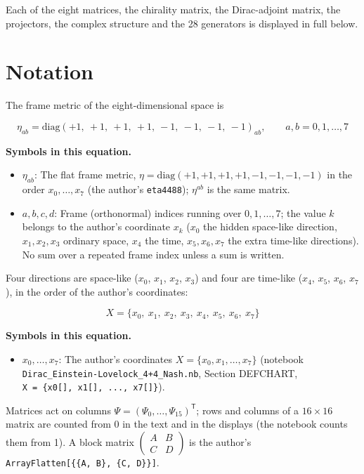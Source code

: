\documentclass[
  10pt,
]{article}
\providecommand{\tightlist}{%
  \setlength{\itemsep}{0pt}\setlength{\parskip}{0pt}}
\begin{document}
Each of the eight matrices, the chirality matrix, the Dirac-adjoint
matrix, the projectors, the complex structure and the 28 generators is
displayed in full below.

\hypertarget{notation}{%
\section{Notation}\label{notation}}

The frame metric of the eight-dimensional space is

\[
\eta_{ab} = \mathrm{diag}(+1,\ +1,\ +1,\ +1,\ -1,\ -1,\ -1,\ -1)_{ab},\qquad a, b = 0, 1, \dots, 7
\]

\textbf{Symbols in this equation.}

\begin{itemize}
\tightlist
\item
  \(\eta_{ab}\): The flat frame metric,
  \(\eta = \mathrm{diag}(+1, +1, +1, +1, -1, -1, -1, -1)\) in the order
  \(x_0, \dots, x_7\) (the author's \texttt{eta4488}); \(\eta^{ab}\) is
  the same matrix.
\item
  \(a, b, c, d\): Frame (orthonormal) indices running over
  \(0, 1, \dots, 7\); the value \(k\) belongs to the author's coordinate
  \(x_k\) (\(x_0\) the hidden space-like direction, \(x_1, x_2, x_3\)
  ordinary space, \(x_4\) the time, \(x_5, x_6, x_7\) the extra
  time-like directions). No sum over a repeated frame index unless a sum
  is written.
\end{itemize}

Four directions are space-like (\(x_0\), \(x_1\), \(x_2\), \(x_3\)) and
four are time-like (\(x_4\), \(x_5\), \(x_6\), \(x_7\)), in the order of
the author's coordinates:

\[
X = \{x_0,\ x_1,\ x_2,\ x_3,\ x_4,\ x_5,\ x_6,\ x_7\}
\]

\textbf{Symbols in this equation.}

\begin{itemize}
\tightlist
\item
  \(x_0, \dots, x_7\): The author's coordinates
  \(X = \{x_0, x_1, \dots, x_7\}\) (notebook
  \texttt{Dirac\_Einstein-Lovelock\_4+4\_Nash.nb}, Section DEFCHART,
  \texttt{X\ =\ \{x0{[}{]},\ x1{[}{]},\ ...,\ x7{[}{]}\}}).
\end{itemize}

Matrices act on columns
\(\Psi = (\Psi_0, \dots, \Psi_{15})^{\mathsf T}\); rows and columns of a
\(16 \times 16\) matrix are counted from 0 in the text and in the
displays (the notebook counts them from 1). A block matrix
\(\begin{pmatrix} A & B \\ C & D \end{pmatrix}\) is the author's
\texttt{ArrayFlatten{[}\{\{A,\ B\},\ \{C,\ D\}\}{]}}.
\end{document}

